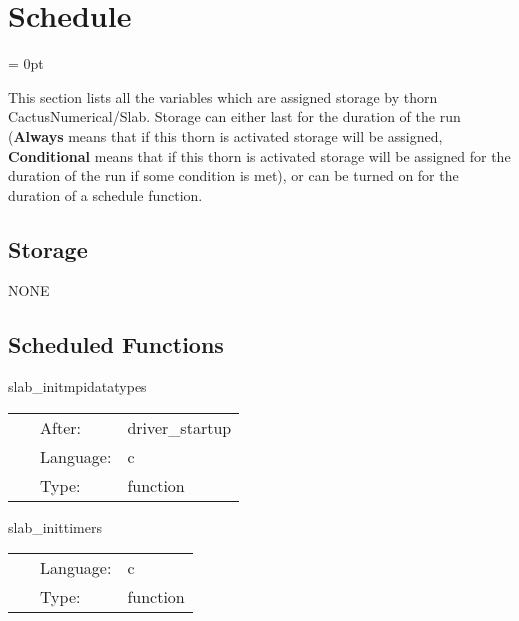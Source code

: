 
\section{Schedule} 


\parskip = 0pt


\noindent This section lists all the variables which are assigned storage by thorn CactusNumerical/Slab.  Storage can either last for the duration of the run ({\bf Always} means that if this thorn is activated storage will be assigned, {\bf Conditional} means that if this thorn is activated storage will be assigned for the duration of the run if some condition is met), or can be turned on for the duration of a schedule function.


\subsection*{Storage}NONE
\subsection*{Scheduled Functions}
\vspace{5mm}


\hspace{5mm} slab\_initmpidatatypes 

\hspace{5mm}{\it create mpi datatypes for complex variables in c } 


\hspace{5mm}

 \begin{tabular*}{160mm}{cll} 
~ & After:  & driver\_startup \\ 
~ & Language:  & c \\ 
~ & Type:  & function \\ 
\end{tabular*} 


\vspace{5mm}


\hspace{5mm} slab\_inittimers 

\hspace{5mm}{\it initialise timers } 


\hspace{5mm}

 \begin{tabular*}{160mm}{cll} 
~ & Language:  & c \\ 
~ & Type:  & function \\ 
\end{tabular*} 


